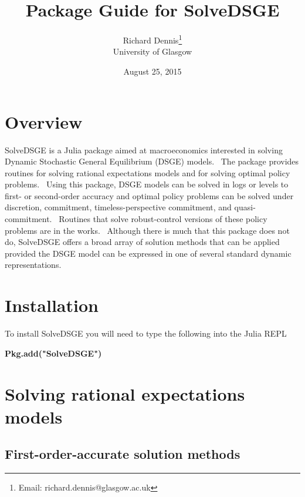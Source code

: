\documentclass[thmsa,notitlepage,11pt]{article}
\begin{document}
\author{Richard Dennis\thanks{%
Email: richard.dennis@glasgow.ac.uk} \\
University of Glasgow}
\title{\textbf{Package Guide for SolveDSGE}\vspace{0.2in}}
\date{August 25, 2015}
\maketitle

\thispagestyle{empty}\newpage \setlength{\baselineskip}{18.95pt}%
\setcounter{page}{1}

\section{Overview}

SolveDSGE is a Julia package aimed at macroeconomics interested in solving
Dynamic Stochastic General Equilibrium (DSGE) models. \ The package provides
routines for solving rational expectations models and for solving optimal
policy problems. \ Using this package, DSGE models can be solved in logs or
levels to first- or second-order accuracy and optimal policy problems can be
solved under discretion, commitment, timeless-perspective commitment, and
quasi-commitment. \ Routines that solve robust-control versions of these
policy problems are in the works. \ Although there is much that this package
does not do, SolveDSGE offers a broad array of solution methods that can be
applied provided the DSGE model can be expressed in one of several standard
dynamic representations.

\section{Installation}

To install SolveDSGE you will need to type the following into the Julia REPL

\bigskip

\textbf{Pkg.add("SolveDSGE")}

\bigskip

\section{Solving rational expectations models}

\subsection{First-order-accurate solution methods}
\end{document}
